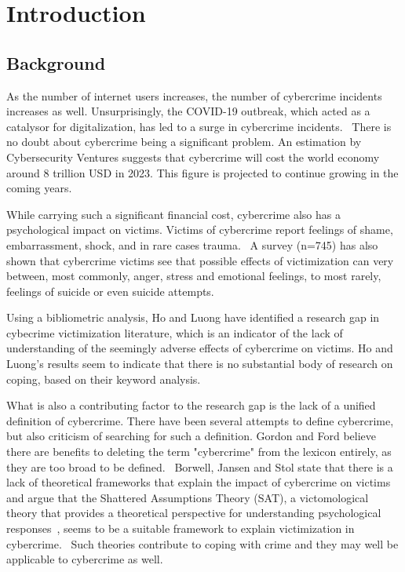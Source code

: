 \section{Introduction}

\subsection{Background}

As the number of internet users increases, the number of cybercrime incidents increases as well. Unsurprisingly, the COVID-19 outbreak, which acted as a catalysor for digitalization, has led to a surge in cybercrime incidents.~\citep{Monteith2021Increasing} There is no doubt about cybercrime being a significant problem. An estimation by Cybersecurity Ventures suggests that cybercrime will cost the world economy around 8 trillion USD in 2023. This figure is projected to continue growing in the coming years.~\citep{cybersecurity-ventures-cybercrime-report}

While carrying such a significant financial cost, cybercrime also has a psychological impact on victims. Victims of cybercrime report feelings of shame, embarrassment, shock, and in rare cases trauma.~\citep{jansen2018coping} A survey (n=745) has also shown that cybercrime victims see that possible effects of victimization can very between, most commonly, anger, stress and emotional feelings, to most rarely, feelings of suicide or even suicide attempts.~\cite{button2014not} 

Using a bibliometric analysis, Ho and Luong have identified a research gap in cybecrime victimization literature, which is an indicator of the lack of understanding of the seemingly adverse effects of cybercrime on victims. Ho and Luong's results seem to indicate that there is no substantial body of research on coping, based on their keyword analysis.~\citep{horesearch}

What is also a contributing factor to the research gap is the lack of a unified definition of cybercrime. There have been several attempts to define cybercrime, but also criticism of searching for such a definition. Gordon and Ford believe there are benefits to deleting the term "cybercrime" from the lexicon entirely, as they are too broad to be defined.~\citep{gordon2006definition} Borwell, Jansen and Stol state that there is a lack of theoretical frameworks that explain the impact of cybercrime on victims and argue that the Shattered Assumptions Theory (SAT), a victomological theory that provides a theoretical perspective for understanding psychological responses~\citep{janoff1983theoretical}, seems to be a suitable framework to explain victimization in cybercrime.~\citep{borwell2022psychological} Such theories contribute to coping with crime and they may well be applicable to cybercrime as well.


